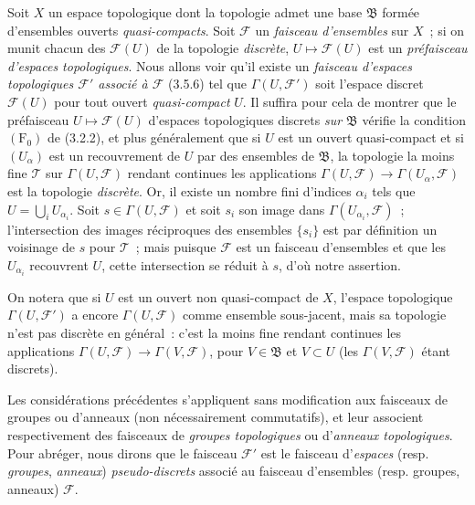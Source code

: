 \begin{env}[3.8.1]
\label{0.3.8.1-fr}
Soit $X$ un espace topologique dont la topologie admet une base
$\mathfrak{B}$ formée d'ensembles ouverts \emph{quasi-compacts}. Soit
$\mathcal{F}$ un \emph{faisceau d'ensembles} sur $X$~; si on munit chacun des
$\mathcal{F}(U)$ de la topologie \emph{discrète},
$U\mapsto\mathcal{F}(U)$ est un \emph{préfaisceau d'espaces topologiques}.
Nous allons voir qu'il existe un \emph{faisceau d'espaces topologiques
$\mathcal{F}'$ associé à $\mathcal{F}$} (3.5.6) tel que
$\Gamma(U,\mathcal{F}')$ soit l'espace discret $\mathcal{F}(U)$ pour tout
ouvert \emph{quasi-compact} $U$. Il suffira pour cela de montrer que le
préfaisceau $U\mapsto\mathcal{F}(U)$ d'espaces topologiques discrets
\emph{sur $\mathfrak{B}$} vérifie la condition $(\mathrm{F}_0)$ de (3.2.2),
et plus généralement que si $U$ est un ouvert quasi-compact et si
$(U_\alpha)$ est un recouvrement de $U$ par des ensembles de $\mathfrak{B}$,
la topologie la moins fine $\mathcal{T}$ sur $\Gamma(U,\mathcal{F})$ rendant
continues les applications
$\Gamma(U,\mathcal{F})\to\Gamma(U_\alpha,\mathcal{F})$ est la topologie
\emph{discrète}. Or, il existe un nombre fini d'indices $\alpha_i$ tels que
$U=\bigcup_i U_{\alpha_i}$. Soit $s\in\Gamma(U,\mathcal{F})$ et soit $s_i$ son
image dans $\Gamma(U_{\alpha_i},\mathcal{F})$~; l'intersection des images
réciproques des ensembles $\{s_i\}$ est par définition un voisinage de $s$
pour $\mathcal{T}$~; mais puisque $\mathcal{F}$ est un faisceau d'ensembles et
que les $U_{\alpha_i}$ recouvrent $U$, cette intersection se réduit à $s$,
d'où notre assertion.

On notera que si $U$ est un ouvert non quasi-compact de $X$, l'espace
topologique $\Gamma(U,\mathcal{F}')$ a encore $\Gamma(U,\mathcal{F})$ comme
ensemble sous-jacent, mais sa topologie n'est pas discrète en général~:
c'est la moins fine rendant continues les applications
$\Gamma(U,\mathcal{F})\to\Gamma(V,\mathcal{F})$, pour $V\in\mathfrak{B}$ et
$V\subset U$ (les $\Gamma(V,\mathcal{F})$ étant discrets).

Les considérations précédentes s'appliquent sans modification aux faisceaux
de groupes ou d'anneaux (non nécessairement commutatifs), et leur associent
respectivement des faisceaux de \emph{groupes topologiques} ou d'\emph{anneaux
topologiques}. Pour abréger, nous dirons que le faisceau $\mathcal{F}'$ est le
faisceau d'\emph{espaces} (resp. \emph{groupes}, \emph{anneaux})
\emph{pseudo-discrets} associé au faisceau d'ensembles (resp. groupes,
anneaux) $\mathcal{F}$.
\end{env}

